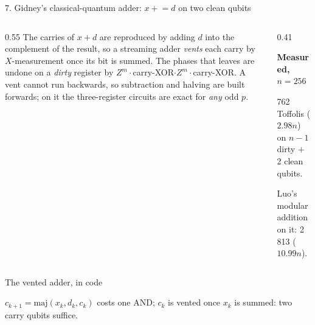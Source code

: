 \documentclass[aspectratio=169,11pt]{beamer}
\newcommand{\peachtitle}[1]{{\bfseries\color{cverm}#1}\par\vskip1mm}
\newcommand{\code}[2][]{}
\begin{document}
\setcounter{framenumber}{192}
\begin{frame}{7. Gidney's classical-quantum adder: $x\mathrel{+}=d$ on two clean qubits}
  \begin{columns}[T]
    \begin{column}{0.55\textwidth}
      The carries of $x+d$ are reproduced by adding $d$ into the complement of the result, so a streaming adder \emph{vents} each carry by $X$-measurement once its bit is summed.
      \vskip2mm
      The phases that leaves are undone on a \emph{dirty} register by $Z^m\cdot$carry-XOR$\cdot Z^m\cdot$carry-XOR.
      \vskip2mm
      {\small A vent cannot run backwards, so subtraction and halving are built forwards; on it the three-register circuits are exact for \emph{any} odd $p$.}
    \end{column}
    \begin{column}{0.41\textwidth}
      \begin{peachblock}\peachtitle{Measured, $n=256$}
        762 Toffolis ($2.98n$) on $n-1$ dirty $+$ 2 clean qubits.\par
        Luo's modular addition on it: 2\,813 ($10.99n$).
      \end{peachblock}
    \end{column}
  \end{columns}
\end{frame}

\setcounter{framenumber}{193}
\begin{frame}[fragile]{The vented adder, in code}
  \code[basicstyle=\ttfamily\scriptsize]{vented_add.py}
  {\small $c_{k+1}=\mathrm{maj}(x_k,d_k,c_k)$ costs one AND; $c_k$ is vented once $x_k$ is summed: two carry qubits suffice.}
\end{frame}
\end{document}
